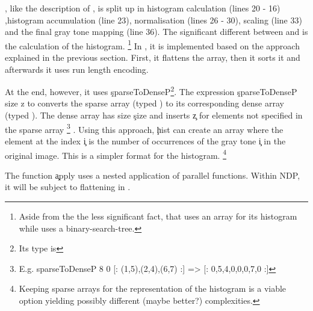  \ndpn, like the description of \algo, 
  is split up in histogram calculation (lines 20 - 16)
  ,histogram accumulation (line 23), normalisation (lines 26 - 30),
  scaling (line 33) and the final gray tone mapping (line 36).
  The significant different between \ndpn and \seq is the calculation of the histogram.
  \footnote{Aside from the the less significant fact, that \ndpn uses an array for its histogram while \seq uses a binary-search-tree.}
  In \ndpn, it is implemented based on the approach explained in the
  previous section. First, it flattens the array, then it sorts it and afterwards
  it uses run length encoding.
  
  At the end, however, it uses \c{sparseToDenseP}\footnote{Its type is  }.
  The expression \c{sparseToDenseP size z} to converts the sparse array (typed )
  to its corresponding dense array (typed \type{[:Int:]}).
  The dense array has size \c{size} and inserts \c{z} for elements not specified in the sparse array
  \footnote{E.g. \c{ sparseToDenseP 8 0 [: (1,5),(2,4),(6,7) :] => [: 0,5,4,0,0,0,7,0 :]}}
  .
  Using this approach, \c{hist} can create an array where
  the element at the index \c{i} is the number of occurrences
  of the gray tone \c{i} in the original image.
  This is a simpler format for the histogram.
  \footnote{Keeping sparse arrays for the representation of the histogram is a viable option yielding possibly different (maybe better?) complexities.}
  
  The function \c{apply} uses a nested application of parallel functions.
  Within NDP, it will be subject to flattening in \ndpv.
  
